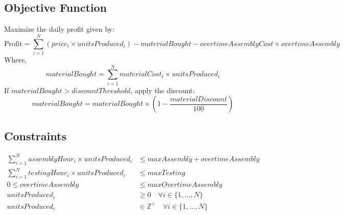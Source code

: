 \documentclass{article}
\begin{document}
\subsection*{Objective Function}
Maximize the daily profit given by:
\[
\text{Profit} = \sum_{i=1}^{N} \left( price_i \times unitsProduced_i \right) - materialBought - overtimeAssemblyCost \times overtimeAssembly
\]
Where,
\[
materialBought = \sum_{i=1}^{N} materialCost_i \times unitsProduced_i
\]
If $materialBought > discountThreshold$, apply the discount:
\[
materialBought = materialBought \times (1 - \frac{materialDiscount}{100})
\]

\subsection*{Constraints}
\begin{align}
    \sum_{i=1}^{N} assemblyHour_i \times unitsProduced_i &\leq maxAssembly + overtimeAssembly \\
    \sum_{i=1}^{N} testingHour_i \times unitsProduced_i &\leq maxTesting \\
    0 \leq overtimeAssembly &\leq maxOvertimeAssembly \\
    unitsProduced_i &\geq 0 \quad \forall i \in \{1, \ldots, N\} \\
    unitsProduced_i &\in \mathbb{Z}^+ \quad \forall i \in \{1, \ldots, N\}
\end{align}
\end{document}
